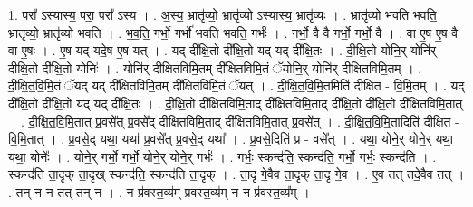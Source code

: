 \documentclass[17pt]{extarticle}
\begin{document}
1. परा᳚ ऽस्यास्य॒ परा॒ परा᳚ ऽस्य । . अ॒स्य॒ भ्रातृ॑व्यो॒ भ्रातृ॑व्यो ऽस्यास्य॒ भ्रातृ॑व्यः । . भ्रातृ॑व्यो भवति भवति॒ भ्रातृ॑व्यो॒ भ्रातृ॑व्यो भवति । . भ॒व॒ति॒ गर्भो॒ गर्भो॑ भवति भवति॒ गर्भः॑ । . गर्भो॒ वै वै गर्भो॒ गर्भो॒ वै । . वा ए॒ष ए॒ष वै वा ए॒षः । . ए॒ष यद् यदे॒ष ए॒ष यत् । . यद् दी᳚क्षि॒तो दी᳚क्षि॒तो यद् यद् दी᳚क्षि॒तः । . दी॒क्षि॒तो योनि॒र् योनि॑र् दीक्षि॒तो दी᳚क्षि॒तो योनिः॑ । . योनि॑र् दीक्षितविमि॒तम् दी᳚क्षितविमि॒तं ॅयोनि॒र् योनि॑र् दीक्षितविमि॒तम् । . दी॒क्षि॒त॒वि॒मि॒तं ॅयद् यद् दी᳚क्षितविमि॒तम् दी᳚क्षितविमि॒तं ॅयत् । . दी॒क्षि॒त॒वि॒मि॒तमिति॑ दीक्षित - वि॒मि॒तम् । . यद् दी᳚क्षि॒तो दी᳚क्षि॒तो यद् यद् दी᳚क्षि॒तः । . दी॒क्षि॒तो दी᳚क्षितविमि॒ताद् दी᳚क्षितविमि॒ताद् दी᳚क्षि॒तो दी᳚क्षि॒तो दी᳚क्षितविमि॒तात् । . दी॒क्षि॒त॒वि॒मि॒तात् प्र॒वसे᳚त् प्र॒वसे᳚द् दीक्षितविमि॒ताद् दी᳚क्षितविमि॒तात् प्र॒वसे᳚त् । . दी॒क्षि॒त॒वि॒मि॒तादिति॑ दीक्षित - वि॒मि॒तात् । . प्र॒वसे॒द् यथा॒ यथा᳚ प्र॒वसे᳚त् प्र॒वसे॒द् यथा᳚ । . प्र॒वसे॒दिति॑ प्र - वसे᳚त् । . यथा॒ योने॒र् योने॒र् यथा॒ यथा॒ योनेः᳚ । . योने॒र् गर्भो॒ गर्भो॒ योने॒र् योने॒र् गर्भः॑ । . गर्भः॒ स्कन्द॑ति॒ स्कन्द॑ति॒ गर्भो॒ गर्भः॒ स्कन्द॑ति । . स्कन्द॑ति ता॒दृक् ता॒दृख् स्कन्द॑ति॒ स्कन्द॑ति ता॒दृक् । . ता॒दृ गे॒वैव ता॒दृक् ता॒दृ गे॒व । . ए॒व तत् तदे॒वैव तत् । . तन् न न तत् तन् न । . न प्र॑वस्त॒व्य॑म् प्रवस्त॒व्य॑म् न न प्र॑वस्त॒व्य᳚म् । \newline
\end{document}
